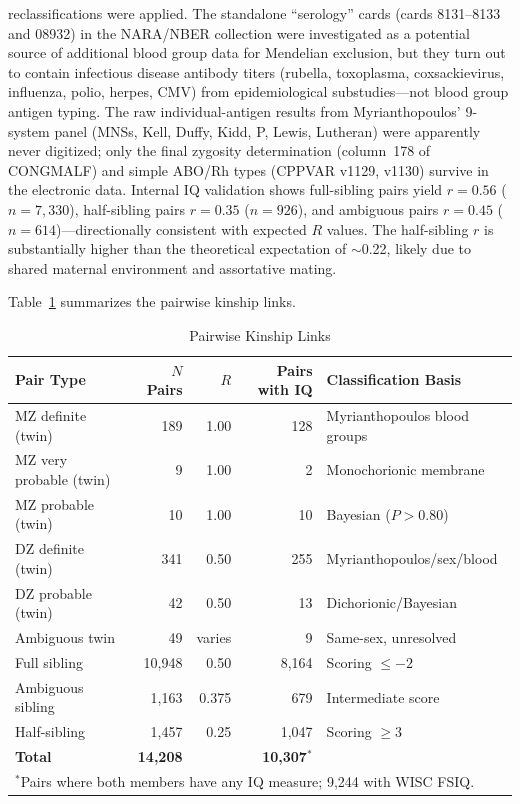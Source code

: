 \documentclass[12pt]{article}
\begin{document}
reclassifications were applied. The standalone ``serology'' cards (cards 8131--8133 and 08932) in the NARA/NBER collection were investigated as a potential source of additional blood group data for Mendelian exclusion, but they turn out to contain infectious disease antibody titers (rubella, toxoplasma, coxsackievirus, influenza, polio, herpes, CMV) from epidemiological substudies---not blood group antigen typing. The raw individual-antigen results from Myrianthopoulos' 9-system panel (MNSs, Kell, Duffy, Kidd, P, Lewis, Lutheran) were apparently never digitized; only the final zygosity determination (column~178 of CONGMALF) and simple ABO/Rh types (CPPVAR v1129, v1130) survive in the electronic data. Internal IQ validation shows full-sibling pairs yield $r = 0.56$ ($n = 7{,}330$), half-sibling pairs $r = 0.35$ ($n = 926$), and ambiguous pairs $r = 0.45$ ($n = 614$)---directionally consistent with expected $R$ values. The half-sibling $r$ is substantially higher than the theoretical expectation of $\sim$0.22, likely due to shared maternal environment and assortative mating.

Table~\ref{tab:kinship} summarizes the pairwise kinship links.

\begin{table}[H]
\centering
\caption{Pairwise Kinship Links}
\label{tab:kinship}
\small
\begin{tabular}{lrrrl}
\toprule
Pair Type & $N$ Pairs & $R$ & Pairs with IQ & Classification Basis \\
\midrule
MZ definite (twin) & 189 & 1.00 & 128 & Myrianthopoulos blood groups \\
MZ very probable (twin) & 9 & 1.00 & 2 & Monochorionic membrane \\
MZ probable (twin) & 10 & 1.00 & 10 & Bayesian ($P > 0.80$) \\
DZ definite (twin) & 341 & 0.50 & 255 & Myrianthopoulos/sex/blood \\
DZ probable (twin) & 42 & 0.50 & 13 & Dichorionic/Bayesian \\
Ambiguous twin & 49 & varies & 9 & Same-sex, unresolved \\
\addlinespace
Full sibling & 10,948 & 0.50 & 8,164 & Scoring $\leq -2$ \\
Ambiguous sibling & 1,163 & 0.375 & 679 & Intermediate score \\
Half-sibling & 1,457 & 0.25 & 1,047 & Scoring $\geq 3$ \\
\midrule
\textbf{Total} & \textbf{14,208} & & \textbf{10,307$^*$} & \\
\bottomrule
\multicolumn{5}{l}{\small $^*$Pairs where both members have any IQ measure; 9,244 with WISC FSIQ.}
\end{tabular}
\end{table}
\end{document}
